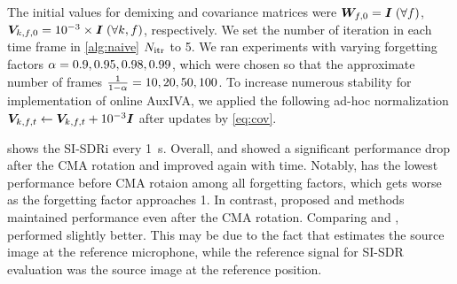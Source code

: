 \documentclass[sip,biber]{now-journal}
\begin{document}
The initial values for demixing and covariance matrices were
$\bm{W} _{f,0} = \bm{I}\; (\forall f)$, $\bm{V} _{k,f,0} = 10^{-3}\times\bm{I}\; (\forall k, f)$, respectively.
We set the number of iteration in each time frame in \cref{alg:naive} $N _{\mathrm{itr}}$ to 5.
We ran experiments with varying forgetting factors $\alpha = 0.9, 0.95, 0.98, 0.99$, which were chosen so that the approximate number of frames $\frac{1}{1 - \alpha} = 10, 20, 50, 100$.
To increase numerous stability for implementation of online AuxIVA,
we applied the following ad-hoc normalization $\cov _{\src,\ft} \gets \cov _{\src,\ft} + 10 ^{-3} \Eye$ after updates by \eqref{eq:cov}.

 shows the SI-SDRi every \SI{1}{\second}.
Overall, \NaiveIVA{} and \ResetIVA{} showed a significant performance drop after the CMA rotation and improved again with time.
Notably, \ResetIVA{} has the lowest performance before CMA rotaion among all forgetting factors, which gets worse as the forgetting factor approaches 1.
In contrast, proposed \RTCov{} and \RTObs{} methods maintained performance even after the CMA rotation.
Comparing \RTCov{} and \RTObs{}, \RTCov{} performed slightly better.
This may be due to the fact that \RTObs{} estimates the source image at the reference microphone, while the reference signal for SI-SDR evaluation was the source image at the reference position.
\end{document}
